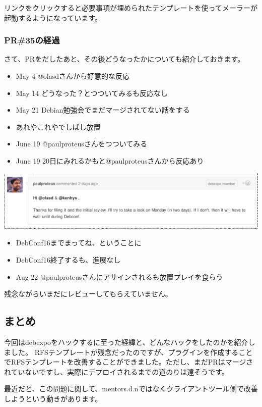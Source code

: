 \documentclass[mingoth,a4paper]{jsarticle}
\begin{document}
リンクをクリックすると必要事項が埋められたテンプレートを使ってメーラーが起動するようになっています。

\subsubsection{PR\#35の経過}

さて、PRをだしたあと、その後どうなったかについても紹介しておきます。

\begin{itemize}
  \item May 4 @olasdさんから好意的な反応
  \item May 14 どうなった？とつついてみるも反応なし
  \item May 21 Debian勉強会でまだマージされてない話をする
  \item あれやこれやでしばし放置
  \item June 19 @paulproteusさんをつついてみる
  \item June 19 20日にみれるかもと@paulproteusさんから反応あり
\end{itemize}

\includegraphics[width=0.7\hsize]{image201606/debexpo-pr35-paulproteus.eps}

\begin{itemize}
  \item DebConf16までまってね、ということに
  \item DebConf16終了するも、進展なし
  \item Aug 22 @paulproteusさんにアサインされるも放置プレイを食らう
\end{itemize}


残念ながらいまだにレビューしてもらえていません。

\subsection{まとめ}

今回はdebexpoをハックするに至った経緯と、どんなハックをしたのかを紹介しました。
RFSテンプレートが残念だったのですが、プラグインを作成することでRFSテンプレートを改善することができました。ただし、まだPRはマージされていないですし、実際にデプロイされるまでの道のりは遠そうです。

最近だと、この問題に関して、mentors.d.nではなくクライアントツール側で改善しようという動きがあります。
\end{document}
